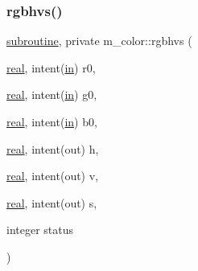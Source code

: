 \subsubsection{\texorpdfstring{rgbhvs()}{rgbhvs()}}
{\footnotesize\ttfamily \hyperlink{M__stopwatch_83_8txt_acfbcff50169d691ff02d4a123ed70482}{subroutine}, private m\+\_\+color\+::rgbhvs (\begin{DoxyParamCaption}\item[{\hyperlink{read__watch_83_8txt_abdb62bde002f38ef75f810d3a905a823}{real}, intent(\hyperlink{M__journal_83_8txt_afce72651d1eed785a2132bee863b2f38}{in})}]{r0,  }\item[{\hyperlink{read__watch_83_8txt_abdb62bde002f38ef75f810d3a905a823}{real}, intent(\hyperlink{M__journal_83_8txt_afce72651d1eed785a2132bee863b2f38}{in})}]{g0,  }\item[{\hyperlink{read__watch_83_8txt_abdb62bde002f38ef75f810d3a905a823}{real}, intent(\hyperlink{M__journal_83_8txt_afce72651d1eed785a2132bee863b2f38}{in})}]{b0,  }\item[{\hyperlink{read__watch_83_8txt_abdb62bde002f38ef75f810d3a905a823}{real}, intent(out)}]{h,  }\item[{\hyperlink{read__watch_83_8txt_abdb62bde002f38ef75f810d3a905a823}{real}, intent(out)}]{v,  }\item[{\hyperlink{read__watch_83_8txt_abdb62bde002f38ef75f810d3a905a823}{real}, intent(out)}]{s,  }\item[{integer}]{status }\end{DoxyParamCaption})\hspace{0.3cm}{\ttfamily [private]}}


